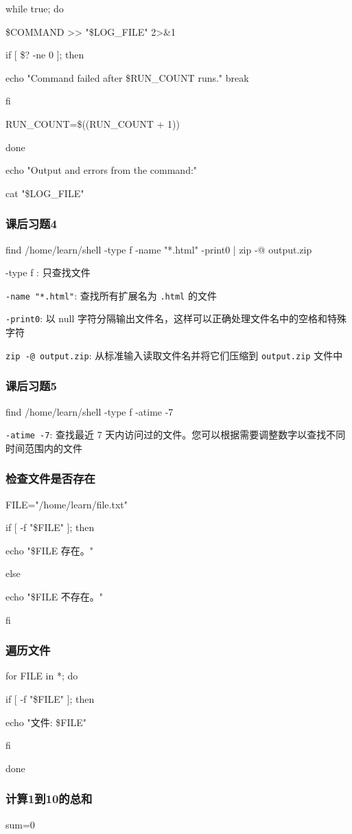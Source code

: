 \documentclass{ctexart}
\begin{document}
while true; do 

 \$COMMAND >> "\$LOG\_FILE" 2>\&1 
 
 if [ \$? -ne 0 ]; then
 
 echo "Command failed after \$RUN\_COUNT runs." break
 
 fi 

 RUN\_COUNT=\$((RUN\_COUNT + 1)) 
 
 done 

 echo "Output and errors from the command:" 
 
 cat "\$LOG\_FILE"  
\subsubsection{课后习题4}
find
/home/learn/shell
-type
f 
-name "*.html" 
-print0 
| 
zip
-@
output.zip

-type f : 只查找文件 

\verb|-name "*.html"|: 查找所有扩展名为 \verb|.html| 的文件 

\verb|-print0|: 以 null 字符分隔输出文件名，这样可以正确处理文件名中的空格和特殊字符 

\verb|zip -@ output.zip|: 从标准输入读取文件名并将它们压缩到 \verb|output.zip| 文件中 
\subsubsection{课后习题5}
find
/home/learn/shell 
-type
f
-atime
-7 

\verb|-atime -7|: 查找最近 7 天内访问过的文件。您可以根据需要调整数字以查找不同时间范围内的文件 
\subsubsection{检查文件是否存在}
FILE="/home/learn/file.txt"

if [ -f "\$FILE" ]; then 

     echo "\$FILE 存在。"
     
else 

     echo "\$FILE 不存在。"
     
fi  
\subsubsection{遍历文件}
for FILE in *; do

if [ -f "\$FILE" ]; then

echo "文件: \$FILE"

fi

done  
\subsubsection{计算1到10的总和}
sum=0 
\end{document}
